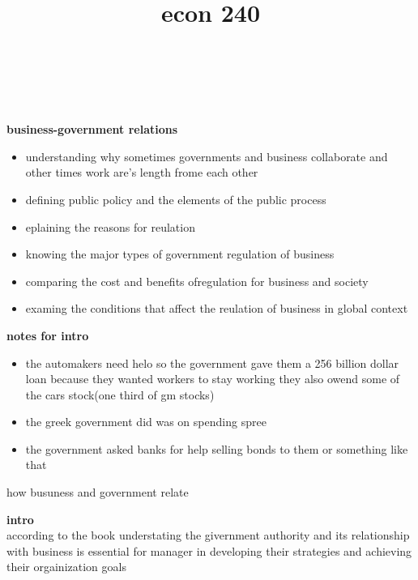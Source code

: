 \documentclass{article}
\newcommand\tab[1][1cm]{\hspace*{#1}}
\begin{document}
\title{econ 240 }
\maketitle
\tab[4cm]{\huge chapter 7}\\ \\ \\
 
 




\textbf{\huge business-government relations  }

\begin{itemize}
\item understanding why sometimes governments and business collaborate and other times work are's length frome each other 

\item defining public  policy and the elements of the public  process 
\item eplaining the reasons for reulation
\item knowing the major types of government regulation of business 
\item comparing the cost and benefits ofregulation for business and society 
\item examing the conditions that affect the reulation of business in global context  

\end{itemize}




\textbf{\huge notes for intro  }


\begin{itemize}
\item the automakers need helo so the government gave them a 256 billion dollar loan because they wanted workers to stay working they also owend some of the cars stock(one third of gm stocks) 
\item the greek government did was on spending spree 
\item the government asked banks for help selling bonds to them or something like that 

\end{itemize}

{\huge how busuness and government relate}

\textbf{intro}\\
according to the book understating the givernment authority and its relationship with business is essential for manager in developing  their strategies and achieving  their orgainization goals
\end{document}
